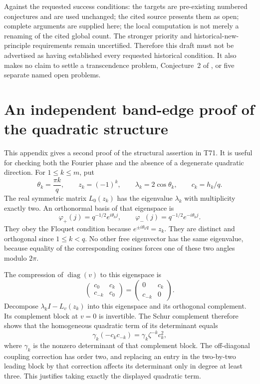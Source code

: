 \documentclass[11pt,a4paper]{article}
\theoremstyle{definition}
\theoremstyle{remark}
\DeclareMathOperator{\diag}{diag}
\begin{document}
Against the requested success conditions: the targets are pre-existing
numbered conjectures and are used unchanged; the cited source presents
them as open; complete arguments are supplied here; the local computation
is not merely a renaming of the cited global count. The stronger priority
and historical-new-principle requirements remain uncertified. Therefore
this draft must not be advertised as having established every requested
historical condition. It also makes no claim to settle a transcendence
problem, Conjecture~2 of \cite{FFORS}, or five separate named open problems.

\appendix
\section{An independent band-edge proof of the quadratic structure}\label{app:bandedge}

This appendix gives a second proof of the structural assertion in T71.
It is useful for checking both the Fourier phase and the absence of a
degenerate quadratic direction.
For $1\leq k\leq m$, put
\[
 \theta_k=\frac{\pi k}{q},\qquad z_k=(-1)^k,\qquad
 \lambda_k=2\cos\theta_k,\qquad c_k=h_k/q.
\]
The real symmetric matrix $L_0(z_k)$ has the eigenvalue $\lambda_k$ with
multiplicity exactly two. An orthonormal basis of that eigenspace is
\[
 \varphi_+(j)=q^{-1/2}e^{i\theta_k j},\qquad
 \varphi_-(j)=q^{-1/2}e^{-i\theta_k j}.
\]
They obey the Floquet condition because $e^{\pm i\theta_k q}=z_k$.
They are distinct and orthogonal since $1\leq k<q$.
No other free eigenvector has the same eigenvalue, because equality of
the corresponding cosines forces one of these two angles modulo $2\pi$.

The compression of $\diag(v)$ to this eigenspace is
\[
 \begin{pmatrix}c_0&c_k\\c_{-k}&c_0\end{pmatrix}
       =\begin{pmatrix}0&c_k\\c_{-k}&0\end{pmatrix}.
\]
Decompose $\lambda_k I-L_v(z_k)$ into this eigenspace and its orthogonal
complement. Its complement block at $v=0$ is invertible. The Schur
complement therefore shows that the homogeneous quadratic term of its
determinant equals
\[
 \gamma_k(-c_kc_{-k})=\gamma_k\zeta^{-k}c_k^2,
\]
where $\gamma_k$ is the nonzero determinant of that complement block.
The off-diagonal coupling correction has order two, and replacing an
entry in the two-by-two leading block by that correction affects its
determinant only in degree at least three. This justifies taking exactly
the displayed quadratic term.
\end{document}
